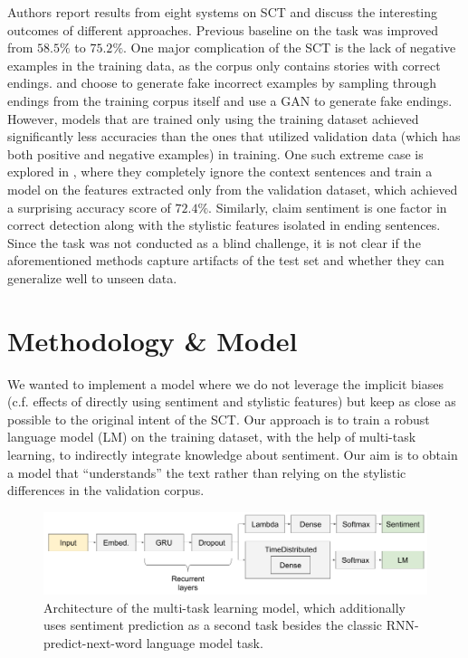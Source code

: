 \documentclass{article}
\begin{document}
\par Authors \citep{mostafazadeh2017lsdsem} report results from eight systems on SCT and discuss the interesting outcomes of different approaches. Previous baseline on the task was improved from $58.5\%$ to $75.2\%$. One major complication of the SCT is the lack of negative examples in the training data, as the corpus only contains stories with correct endings. \citet{roemmele2017rnn} and \citet{bugert2017lsdsem} choose to generate fake incorrect examples by sampling through endings from the training corpus itself and \citet{wang2017conditional} use a GAN to generate fake endings. However, models that are trained only using the training dataset achieved significantly less accuracies than the ones that utilized validation data (which has both positive and negative examples) in training. One such extreme case is explored in \citet{schwartz2017effect}, where they completely ignore the context sentences and train a model on the features extracted only from the validation dataset, which achieved a surprising accuracy score of $72.4\%$. Similarly, \citet{mostafazadeh2017lsdsem} claim sentiment is one factor in correct detection along with the stylistic features isolated in ending sentences. Since the task was not conducted as a blind challenge, it is not clear if the aforementioned methods capture artifacts of the test set and whether they can generalize well to unseen data.

\section{Methodology \& Model}
We wanted to implement a model where we do not leverage the implicit biases (c.f. effects of directly using sentiment and stylistic features) but keep as close as possible to the original intent of the SCT. Our approach is to train a robust language model (LM) on the training dataset, with the help of multi-task learning, to indirectly integrate knowledge about sentiment. Our aim is to obtain a model that ``understands” the text rather than relying on the stylistic differences in the validation corpus.

\begin{figure}[htbp]
\includegraphics[width=\textwidth]{nlu_model.png}
\centering
\caption{Architecture of the multi-task learning model, which additionally uses sentiment prediction as a second task besides the classic RNN-predict-next-word language model task.}
\label{fig:model}
\end{figure}
\end{document}
